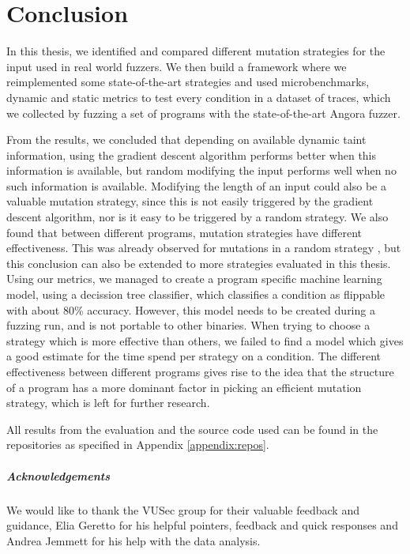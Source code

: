 
\chapter{Conclusion}\label{chap:conclusion} %





% 
In this thesis, we identified and compared different mutation strategies for the input used in real world fuzzers. We then build a framework where we reimplemented some state-of-the-art strategies and used microbenchmarks, dynamic and static metrics to test every condition in a dataset of traces, which we collected by fuzzing a set of programs with the state-of-the-art Angora fuzzer.

From the results, we concluded that depending on available dynamic taint information, using the gradient descent algorithm performs better when this information is available, but random modifying the input performs well when no such information is available. Modifying the length of an input could also be a valuable mutation strategy, since this is not easily triggered by the gradient descent algorithm, nor is it easy to be triggered by a random strategy.
We also found that between different programs, mutation strategies have different effectiveness. This was already observed for mutations in a random strategy \cite{lyu2019mopt}, but this conclusion can also be extended to more strategies evaluated in this thesis. 
Using our metrics, we managed to create a program specific machine learning model, using a decission tree classifier, which classifies a condition as flippable with about 80\% accuracy. However, this model needs to be created during a fuzzing run, and is not portable to other binaries.
When trying to choose a strategy which is more effective than others, we failed to find a model which gives a good estimate for the time spend per strategy on a condition.
The different effectiveness between different programs gives rise to the idea that the structure of a program has a more dominant factor in picking an efficient mutation strategy, which is left for further research.

All results from the evaluation and the source code used can be found in the repositories as specified in Appendix \ref{appendix:repos}.

\paragraph*{Acknowledgements}
We would like to thank the VUSec group for their valuable feedback and guidance, Elia Geretto for his helpful pointers, feedback and quick responses and Andrea Jemmett for his help with the data analysis.

